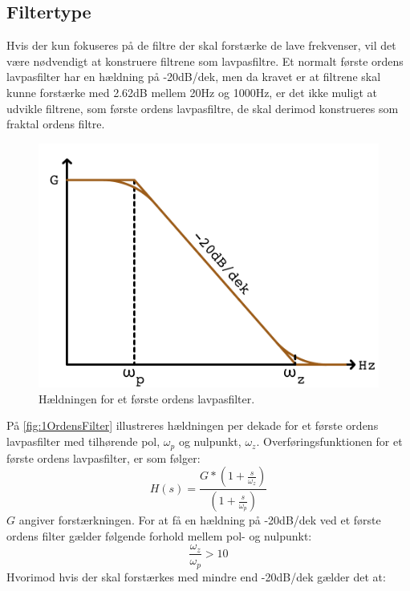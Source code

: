 \subsection{Filtertype}
\label{Filtertype}
%
Hvis der kun fokuseres på de filtre der skal forstærke de lave frekvenser, vil det være nødvendigt at konstruere filtrene som lavpasfiltre. Et normalt første ordens lavpasfilter har en hældning på -20dB/dek, men da kravet er at filtrene skal kunne forstærke med 2.62dB mellem 20Hz og 1000Hz, er det ikke muligt at udvikle filtrene, som første ordens lavpasfiltre, de skal derimod konstrueres som fraktal ordens filtre. 
%
\begin{figure}[H]
	\centering
	\includegraphics[resolution=300,scale=\circuitSize]{Figure/DesignAfFilter/FoersteordensFilter.pdf}
	\caption{Hældningen for et første ordens lavpasfilter.}
	\label{fig:1OrdensFilter}
\end{figure}
\noindent
%
På \autoref{fig:1OrdensFilter} illustreres hældningen per dekade for et første ordens lavpasfilter med tilhørende pol, $\omega_p$ og nulpunkt, $\omega_z$. Overføringsfunktionen for et første ordens lavpasfilter, er som følger:
%
\begin{equation}
	H(s) = \frac{G*\left(1+\frac{s}{\omega_z}\right)}{\left(1+\frac{s}{\omega_p}\right)}
\end{equation}  
%
$G$ angiver forstærkningen. For at få en hældning på -20dB/dek ved et første ordens filter gælder følgende forhold mellem pol- og nulpunkt:
%
\begin{equation}
	\frac{\omega_z}{\omega_p} > 10
\end{equation} 
%
Hvorimod hvis der skal forstærkes med mindre end -20dB/dek gælder det at:

